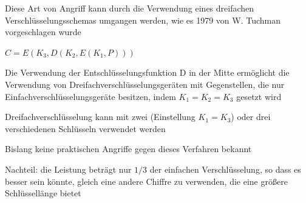 \documentclass[a4paper]{article}
\begin{document}
\begin{multicols}{3}
\begin{itemize*}
            \item Diese Art von Angriff kann durch die Verwendung eines dreifachen Verschlüsselungsschemas umgangen werden, wie es 1979 von W. Tuchman vorgeschlagen wurde
            \item $C=E(K_3,D(K_2,E(K_1,P)))$
            \item Die Verwendung der Entschlüsselungsfunktion D in der Mitte ermöglicht die Verwendung von Dreifachverschlüsselungsgeräten mit Gegenstellen, die nur Einfachverschlüsselungsgeräte besitzen, indem $K_1=K_2=K_3$ gesetzt wird
            \item Dreifachverschlüsselung kann mit zwei (Einstellung $K_1=K_3$) oder drei verschiedenen Schlüsseln verwendet werden
            \item Bislang keine praktischen Angriffe gegen dieses Verfahren bekannt
            \item Nachteil: die Leistung beträgt nur $1/3$ der einfachen Verschlüsselung, so dass es besser sein könnte, gleich eine andere Chiffre zu verwenden, die eine größere Schlüssellänge bietet
      \end{itemize*}


\end{multicols}
\end{document}
